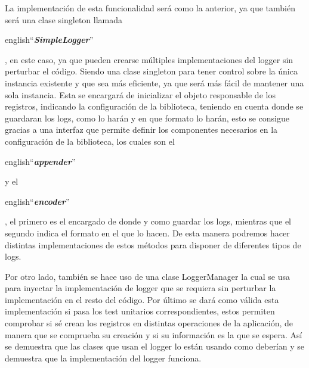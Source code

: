 La implementación de esta funcionalidad será como la anterior, ya que también será una clase singleton llamada 
\begin{otherlanguage} {english}``\textit{\textbf{SimpleLogger}}''\end{otherlanguage}, en este caso, ya que pueden 
crearse múltiples implementaciones del logger sin perturbar el código. Siendo una clase singleton para tener control 
sobre la única instancia existente y que sea más eficiente, ya que será más fácil de mantener una sola instancia. 
Esta se encargará de inicializar el objeto responsable de los registros, indicando la configuración de la 
biblioteca, teniendo en cuenta donde se guardaran los logs, como lo harán y en que formato lo harán, esto se 
consigue gracias a una interfaz que permite definir los componentes necesarios en la configuración de la biblioteca, 
los cuales son el \begin{otherlanguage} {english}``\textit{\textbf{appender}}''\end{otherlanguage} y el 
\begin{otherlanguage} {english}``\textit{\textbf{encoder}}''\end{otherlanguage}, el primero es el encargado de donde 
y como guardar los logs, mientras que el segundo indica el formato en el que lo hacen. De esta manera podremos hacer 
distintas implementaciones de estos métodos para disponer de diferentes tipos de logs.

Por otro lado, también se hace uso de una clase LoggerManager la cual se usa para inyectar la implementación de 
logger que se requiera sin perturbar la implementación en el resto del código. Por último se dará como válida esta
implementación si pasa los test unitarios correspondientes, estos permiten comprobar si sé crean los registros en 
distintas operaciones de la aplicación, de manera que se comprueba su creación y si su información es la que se 
espera. Así se demuestra que las clases que usan el logger lo están usando como deberían y se demuestra que la 
implementación del logger funciona.